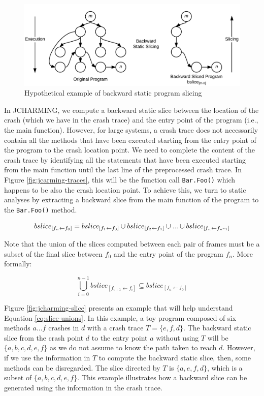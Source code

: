 \documentclass[12pt]{report}
\def\mymathhyphen{{\hbox{-}}}
\begin{document}
\begin{figure}
  \centering
    \includegraphics[scale=.2]{media/chap8/backward-slicing.png}
    \caption{Hypothetical example of backward static program slicing\label{fig:backward-slicing}}
\end{figure}

In JCHARMING, we compute a backward static slice between the location of
the crash (which we have in the crash trace) and the entry point of the
program (i.e., the main function). However, for large systems, a crash
trace does not necessarily contain all the methods that have been
executed starting from the entry point of the program to the crash
location point. We need to complete the content of the crash trace by
identifying all the statements that have been executed starting from the
main function until the last line of the preprocessed crash trace. In
Figure \ref{fig:jcarming-traces}, this will be the function call
\lstinline!Bar.Foo()! which happens to be also the crash location point.
To achieve this, we turn to static analyses by extracting a backward
slice from the main function of the program to the \lstinline!Bar.Foo()!
method.

\begin{equation}
bslice_{[f_n \leftarrow f_0]} = bslice_{[f_1 \leftarrow f_0]} \cup bslice_{[f_2 \leftarrow f_1]} \cup ... \cup bslice_{[f_n \leftarrow f_{n\mymathhyphen1}]}
\end{equation}

Note that the union of the slices computed between each pair of frames
must be a subset of the final slice between \(f_0\) and the entry point
of the program \(f_n\). More formally:

\begin{equation}
\bigcup_{i=0}^{n-1} bslice_{[f_{i+1} \leftarrow f_i]} \subseteq bslice_{[f_n \leftarrow f_0]}
\label{eq:slice-unions}
\end{equation}

Figure \ref{fig:jcharming-slice} presents an example that will help
understand Equation \ref{eq:slice-unions}. In this example, a toy
program composed of six methods \(a...f\) crashes in \(d\) with a crash
trace \(T = \{e, f, d\}\). The backward static slice from the crash
point \(d\) to the entry point \(a\) without using \(T\) will be
\(\{a, b, c, d, e, f\}\) as we do not assume to know the path taken to
reach \(d\). However, if we use the information in \(T\) to compute the
backward static slice, then, some methods can be disregarded. The slice
directed by \(T\) is \(\{a, e, f, d\}\), which is a subset of
\(\{a, b, c, d, e, f\}\). This example illustrates how a backward slice
can be generated using the information in the crash trace.
\end{document}
